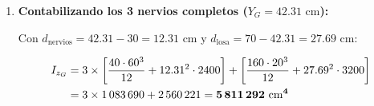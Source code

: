 {\begin{enumerate}
        \item \textbf{Contabilizando los 3 nervios completos ($Y_G = 42.31\text{ cm}$):}

              Con $d_{\text{nervios}} = 42.31 - 30 = 12.31\text{ cm}$ y $d_{\text{losa}} = 70 - 42.31 = 27.69\text{ cm}$:

              \begin{align}
                  I_{z_G} & = 3 \times \left[ \frac{40 \cdot 60^3}{12} + 12.31^2 \cdot 2400 \right] + \left[ \frac{160 \cdot 20^3}{12} + 27.69^2 \cdot 3200 \right] \notag \\
                          & = 3 \times 1\,083\,690 + 2\,560\,221 = \mathbf{5\,811\,292\text{ cm}^4}
\end{align}

    \end{enumerate}

}

